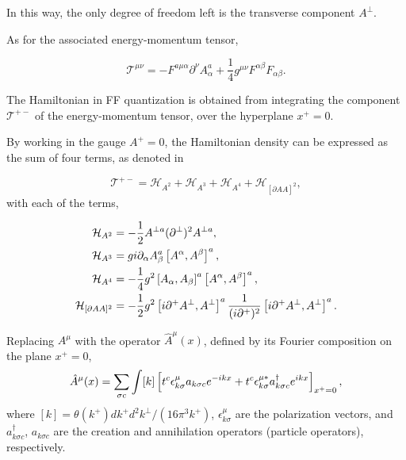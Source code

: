 \documentclass[11pt,a4paper,twoside,pdf]{article}
\numberwithin{equation}{section}
\begin{document}
In this way, the only degree of freedom left is the transverse component $A^\perp$.

As for the associated energy-momentum tensor,

\begin{equation}
    \mathcal{T}^{\mu\nu} = -F^{a\mu\alpha}\partial^\nu A^a_\alpha + 
    \frac{1}{4}g^{\mu\nu}F^{\alpha\beta} F_{\alpha\beta}.
\end{equation}

The Hamiltonian in FF quantization is obtained from integrating the component
$\mathcal{T}^{+-}$ of the energy-momentum tensor, over the hyperplane $x^+=0$. 

By working in the gauge $A^+=0$, the Hamiltonian density can be expressed as the sum of 
four terms, as denoted in \cite{glazek_dynamics_2001}

\begin{equation}
    \mathcal{T}^{+-} = \mathcal{H}_{A^2} + \mathcal{H}_{A^3} +
    \mathcal{H}_{A^4} + \mathcal{H}_{[\partial AA]^2},
\end{equation}
with each of the terms, 

\begin{align}
    \mathcal{H}_{A^2} &= -\frac{1}{2} A^{\perp a} (\partial^\perp)^2 A^{\perp a}, \\
    \mathcal{H}_{A^3} &= g i \partial_\alpha A^a_\beta \left[ A^\alpha, A^\beta \right]^a, \\
    \mathcal{H}_{A^4} &= -\frac{1}{4} g^2 \left[ A_\alpha, A_\beta \right]^a
    \left[ A^\alpha, A^\beta \right]^a, \\
    \mathcal{H}_{[\partial AA]^2} &= -\frac{1}{2} g^2 \left[ i \partial^+ A^\perp,
    A^\perp \right]^a  \frac{1}{(i\partial^+)^2} \left[ i\partial^+ A^\perp, A^\perp \right]^a.
\end{align}

Replacing $A^\mu$ with the operator $\hat{A}^\mu(x)$, defined by its Fourier composition
on the plane $x^+=0$,
\begin{equation}
    \hat{A}^\mu(x) = \sum _{\sigma c} \int [k] \left[ t^c \epsilon^\mu_{k \sigma} 
    a_{k\sigma c}  e^{-ikx} + t^c \epsilon^{\mu*}_{k \sigma} 
    a^\dagger_{k\sigma c}  e^{ikx} \right]_{x^+=0},
\end{equation}
where $[k] = \theta(k^+) dk^+ d^2k^\perp / (16\pi^3k^+)$, $\epsilon^\mu_{k \sigma}$ 
are the polarization vectors, and $a^\dagger_{k\sigma c}$, $a_{k\sigma c}$ are the 
creation and annihilation operators (particle operators), respectively. 
\end{document}
